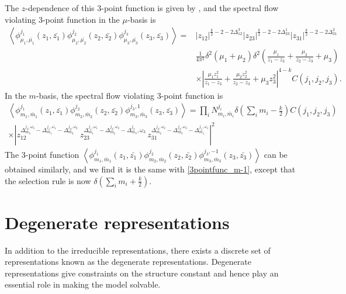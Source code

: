 \documentclass[10pt,a4paper]{article}
\numberwithin{equation}{section}
\newcommand{\vev}[1]{\left\langle #1 \right\rangle}
\begin{document}
The $z$-dependence of this 3-point function is given by \cite{Ribault:2005ms}, and the spectral flow violating 3-point function 
in the $\mu$-basis is 
\begin{equation}
    \begin{aligned}
        \vev{ \phi^{j_{1}}_{\mu_{1},\bar{\mu_{1}}}(z_{1},\bar{z_{1}}) \phi^{j_{2}}_{\mu_{2},\bar{\mu_{2}}}(z_{2},\bar{z_{2}}) \phi^{j_{3}}_{\mu_{3},\bar{\mu_{3}}}(z_{3},\bar{z_{3}})}
        = & |z_{12}|^{\frac{k}{2} -2-2\Delta^{3}_{12}} |z_{23}|^{\frac{k}{2} -2-2\Delta^{1}_{23}} |z_{31}|^{\frac{k}{2} -2-2\Delta^{2}_{31}}\\
        & \frac{1}{4 \pi^{2}} \delta^{2}(\mu_{1} + \mu_{2}) \delta^{2}\left(\frac{\mu_{1}}{z_{1}-z_{3}} + \frac{\mu_{2}}{z_{2}-z_{3}} + \mu_{3}\right)\\
        & \times \left| \frac{\mu_{1} z_{1}^{2}}{z_{1}-z_{3}} + \frac{\mu_{2} z_{2}^{2}}{z_{2}-z_{3}} + \mu_{3} z_{3}^{2} \right|^{4-k} C(j_{1},j_{2},j_{3}).
    \end{aligned}
\end{equation}
In the $m$-basis, the spectral flow violating 3-point function is 
\begin{equation}
    \begin{aligned}
        \vev{ \phi^{j_{1}}_{m_{1},\bar{m}_{1}}(z_{1},\bar{z_{1}}) \phi^{j_{2}}_{m_{2},\bar{m}_{2}}(z_{2},\bar{z_{2}}) 
        \phi^{j_{3},1}_{m_{3},\bar{m}_{3}}(z_{3},\bar{z_{3}}) } = \prod_{i} N^{j_{i}}_{m_{i},\bar{m}_{i}} \delta(\sum_{i} m_{i} - \frac{k}{2}) C(j_{1},j_{2},j_{3}) \\
        \times \left| z_{12}^{\Delta_{m_{3}}^{j_{3},\omega_{3}} -\Delta_{m_{1}}^{j_{1},\omega_{1}}-\Delta_{m_{2}}^{j_{2},\omega_{2}}} \, 
        z_{23}^{\Delta_{m_{1}}^{j_{1},\omega_{1}} -\Delta_{m_{2}}^{j_{2},\omega_{2}}-\Delta_{m_{3}}^{j_{3}} ,\omega_{3}} \, 
        z_{31}^{\Delta_{m_{2}}^{j_{2},\omega_{2}} -\Delta_{m_{3}}^{j_{3},\omega_{3}} -\Delta_{m_{1}}^{j_{1},\omega_{1}}}\right|^{2}
    \end{aligned} \label{3pointfunc_m-1}
\end{equation}
The 3-point function $\vev{ \phi^{j_{1}}_{m_{1},\bar{m}_{1}}(z_{1},\bar{z_{1}}) \phi^{j_{2}}_{m_{2},\bar{m}_{2}}(z_{2},\bar{z_{2}}) 
        \phi^{j_{3},-1}_{m_{3},\bar{m}_{3}}(z_{3},\bar{z_{3}}) } $ can be obtained similarly, and we find it is the same with \eqref{3pointfunc_m-1},
except that the selection rule is now $\delta(\sum_{i} m_{i} + \frac{k}{2})$. 

\section{Degenerate representations}
In addition to the irreducible representations, there exists a discrete set of representations known as the 
degenerate representations. Degenerate representations give constraints on the structure constant and hence play an essential role in 
making the model solvable. 
\end{document}
